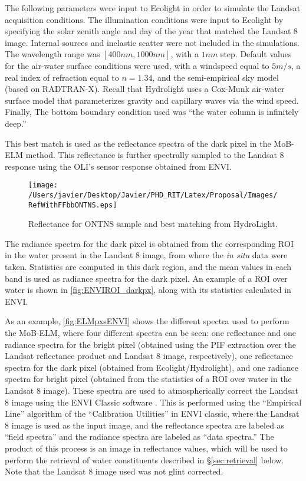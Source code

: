 The following parameters were input to Ecolight in order to simulate the Landsat acquisition conditions. The illumination conditions were input to Ecolight by specifying the solar zenith angle and day of the year that matched the Landsat 8 image. Internal sources and inelastic scatter were not included in the simulations. The wavelength range was $[400nm,1000nm]$, with a $1nm$ step. Default values for the air-water surface conditions were used, with a windspeed equal to $5m/s$, a real index of refraction equal to $n=1.34$, and the semi-empirical sky model (based on RADTRAN-X). Recall that Hydrolight uses a Cox-Munk air-water surface model that parameterizes gravity and capillary waves via the wind speed. Finally, The bottom boundary condition used was ``the water column is infinitely deep.''

This best match is used as the reflectance spectra of the dark pixel in the MoB-ELM method. This reflectance is further spectrally sampled to the Landsat 8 response using the OLI's sensor response obtained from ENVI. 

\begin{figure}[htb]
  	\centering
  	\texttt{[image: /Users/javier/Desktop/Javier/PHD\_RIT/Latex/Proposal/Images/RefWithFFbbONTNS.eps]}
  \caption{Reflectance for ONTNS sample and best matching from HydroLight. \label{fig:BestMatchONTNS} } 
\end{figure}

The radiance spectra for the dark pixel is obtained from the corresponding ROI in the water present in the Landsat 8 image, from where the {\it in situ} data were taken. Statistics are computed in this dark region, and the mean values in each band is used as radiance spectra for the dark pixel. An example of a ROI over water is shown in \autoref{fig:ENVIROI_darkpx}, along with its statistics calculated in ENVI.

As an example, \autoref{fig:ELMpxsENVI} shows the different spectra used to perform the MoB-ELM, where four different spectra can be seen: one reflectance and one radiance spectra for the bright pixel (obtained using the PIF extraction over the Landsat reflectance product and Landsat 8 image, respectively), one reflectance spectra for the dark pixel (obtained from Ecolight/Hydrolight), and one radiance spectra for bright pixel (obtained from the statistics of a ROI over water in the Landsat 8 image). These spectra are used to atmospherically correct the Landsat 8 image using the ENVI Classic software \cite{ENVIUserGuide}. This is performed using the ``Empirical Line'' algorithm of the ``Calibration Utilities'' in ENVI classic, where the Landsat 8 image is used as the input image, and the reflectance spectra are labeled as ``field spectra'' and the radiance spectra are labeled as ``data spectra.'' The product of this process is an image in reflectance values, which will be used to perform the retrieval of water constituents described in \S\ref{sec:retrieval} below. Note that the Landsat 8 image used was not glint corrected.

